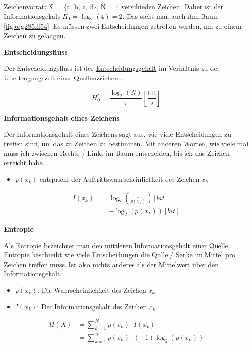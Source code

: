 \documentclass[11pt,twoside,twocolumn,landscape]{article}
\begin{document}
Zeichenvorrat: X = \{a, b, c, d\}, N = 4 verschieden Zeichen.
Daher ist der Informationsgehalt \(H_0 = \log_2(4) = 2\).
Das sieht man auch ihm Baum \ref{fig:org285df54}.
Es müssen zwei Entscheidungen getroffen werden, um zu einem Zeichen zu gelangen.

\textbf{Entscheidungsfluss}

Der Entscheidungsfluss ist der \href{../../../roam/20211001174136-was_ist_der_entscheidungsgehalt.org}{Entscheidungsgehalt} im Verhältnis zu der Übertragungszeit eines Quellenzeichens.

\begin{equation}
H_0^* = \frac{\log_2(N)}{\tau}[\frac{\text{bit}}{s}]
\end{equation}

\textbf{Informationsgehalt eines Zeichens}

Der Informationsgehalt eines Zeichens sagt aus, wie viele Entscheidungen zu treffen sind, um das zu Zeichen zu bestimmen.
Mit anderen Worten, wie viele mal muss ich zwischen Rechts / Links im Baum entscheiden, bis ich das Zeichen erreicht habe.

\begin{itemize}
\item \(p(x_k)\) entspricht der Auftrittswahrscheinlichkeit des Zeichen \(x_k\)
\end{itemize}

\begin{align}
I(x_k) &= \log_2(\frac{1}{p(x_k)}) [bit] \\
&= -\log_2(p(x_k)) [bit]
\end{align}

\textbf{Entropie}

Als Entropie bezeichnet man den mittleren \href{../../../roam/20211001175826-was_ist_der_informationsgehalt_eines_zeichen.org}{Informationsgehalt} einer Quelle.
Entropie beschreibt wie viele Entscheidungen die Qulle / Senke im Mittel pro Zeichen treffen muss.
Ist also nichts anderes als der Mittelwert über den \href{../../../roam/20211001175826-was_ist_der_informationsgehalt_eines_zeichen.org}{Informationsgehalt}.

\begin{itemize}
\item \(p(x_k)\): Die Wahrscheinlichkeit des Zeichen \(x_k\)
\item \(I(x_k)\): Der Informationsgehalt des Zeichen \(x_k\)
\end{itemize}

\begin{align}
H(X) &= \sum_{k=1}^N p(x_k) \cdot I(x_k) \\
&= \sum_{k=1}^N p(x_k) \cdot (-1)\log_2(p(x_k))
\end{align}
\end{document}
